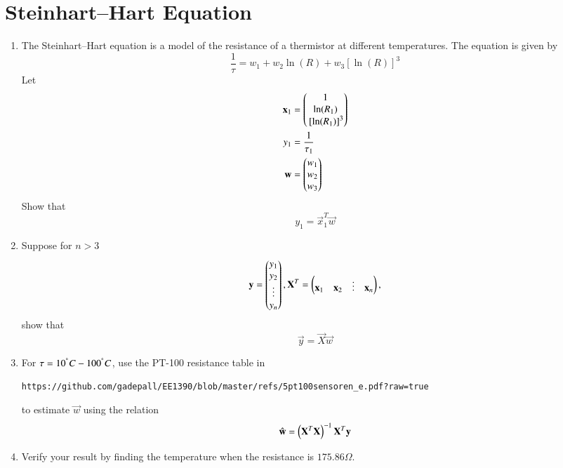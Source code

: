 \documentclass[journal,12pt,twocolumn]{IEEEtran}
\renewcommand\thesection{\arabic{section}}
\begin{document}
\section{Steinhart–Hart Equation}
\begin{enumerate}[label=\thesection.\arabic*
,ref=\thesection.\theenumi]
%
\item The Steinhart–Hart equation is a model of the resistance of a 
thermistor at different temperatures. The equation is given by
\begin{equation}
\label{eq:ls_steiner}
\frac{1}{ \tau}=w_1+w_2\ln(R)+w_3[\ln(R)]^{3}
\end{equation}
%
Let
\begin{align}
\mathbf{x}_1 &= \begin{pmatrix}1 \\ \ln(R_1)\\{}\left[\ln(R_1)\right]^{3}\end{pmatrix}
\\
{y}_1 &=  \frac{1}{\tau_1}
\\
\mathbf{w} &= \begin{pmatrix}w_1\\ w_2\\w_3 \end{pmatrix}
\end{align}
%
Show that
\begin{equation}
{y}_1 =  \vec{x}_1^T\vec{w}
\end{equation}
\item Suppose for $n > 3$
\begin{align}
\mathbf{y} = \begin{pmatrix}y_1 \\ y_2\\ \vdots \\ y_n\end{pmatrix},
\mathbf{X}^T  = \begin{pmatrix}\mathbf{x}_1& \mathbf{x}_2 & \vdots &\mathbf{x}_n \end{pmatrix},
\end{align}
%
show that 
\begin{equation}
\vec{y} = \vec{X}\vec{w}
\end{equation}
%
\item For $\tau = 10^{\degree} C - 100^{\degree} C$, use the PT-100 resistance table in
\begin{lstlisting}
https://github.com/gadepall/EE1390/blob/master/refs/5pt100sensoren_e.pdf?raw=true
\end{lstlisting}
to estimate $\vec{w}$ 
using 
the relation
\begin{equation}
\hat{\mathbf{w}} = \left(\mathbf{X}^T\mathbf{X}\right)^{-1}\mathbf{X}^T\mathbf{y}
\end{equation}
\item Verify your result by finding the temperature when the resistance is $175.86\Omega$.
\end{enumerate}
\end{document}
